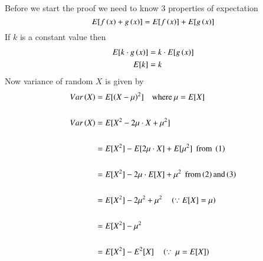 Before we start the proof we need to know 3 properties of expectation
\begin{equation}
E[f\left(x\right)+g\left(x\right)] = E[f\left(x\right)]+E[g\left(x\right)]
\end{equation}
If $k$ is a constant value then 
\begin{align}
E[k\cdot g\left(x\right)] &= k\cdot E[g\left(x\right)]\\
E[k]&=k
\end{align}
Now variance of random $X$ is given by 
\begin{align}
\nonumber \nonumber Var\left(X\right) &= E[\left(X-\mu\right)^2] \quad \text{where} \: \mu =E[X]\\
\nonumber \\
\nonumber Var\left(X\right)&= E[X^2-2\mu\cdot X + \mu^2]\\
\nonumber\\
\nonumber &= E[X^2]-E[2\mu\cdot X] + E[\mu^2] \:\: \text{from } \left(1\right)\\
\nonumber\\
\nonumber &=E[X^2]-2\mu\cdot E[X] + \mu^2 \:\: \text{from} \left(2\right) \text{and} \left(3\right)\\
\nonumber \\
\nonumber &=E[X^2]-2\mu^2+\mu^2 \quad \left(\because E[X]=\mu\right)\\
\nonumber \\
\nonumber &= E[X^2]-\mu^2\\
\nonumber \\
\nonumber &= E[X^2]-E^2[X] \quad \left(\because \: \mu = E[X]\right)
\end{align}
